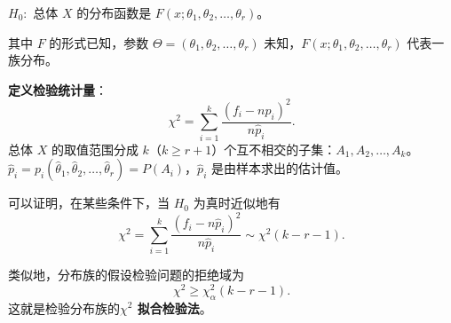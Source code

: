 \documentclass[11pt,a4paper]{report}
\theoremstyle{definition}
\begin{document}
$H_{0}\colon$ 总体 $X$ 的分布函数是 $F(x;\theta_{1},\theta_{2},\ldots,\theta_{r})$。

其中 $F$ 的形式已知，参数 $\Theta=(\theta_{1},\theta_{2},\ldots,\theta_{r})$ 未知，$F(x;\theta_{1},\theta_{2},\ldots,\theta_{r})$ 代表一族分布。

\textbf{定义检验统计量}：
\[
\chi^{2}=\sum_{i=1}^{k}\frac{(f_{i}-n\widehat{p}_{i})^{2}}{n\widehat{p}_{i}}.
\]
总体 $X$ 的取值范围分成 $k$（$k\geq r+1$）个互不相交的子集：$A_{1},A_{2},\ldots,A_{k}$。
$\widehat{p}_{i}=p_{i}(\widehat{\theta}_{1},\widehat{\theta}_{2},\ldots,\widehat{\theta}_{r})=P(A_{i})$，$\widehat{p}_{i}$ 是由样本求出的估计值。

可以证明，在某些条件下，当 $H_{0}$ 为真时近似地有
\[
\chi^{2}=\sum_{i=1}^{k}\frac{(f_{i}-n\widehat{p}_{i})^{2}}{n\widehat{p}_{i}}\sim\chi^{2}(k-r-1).
\]

类似地，分布族的假设检验问题的拒绝域为
\[
\chi^{2}\geq\chi_{\alpha}^{2}(k-r-1).
\]
这就是检验分布族的\textbf{$\chi^{2}$ 拟合检验法}。
\end{document}
